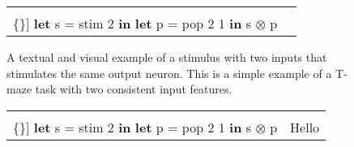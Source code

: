 \begin{figure}
  \ContinuedFloat*
  \begin{tabular}[t]{c c}
    \begin{minipage}{0.5\textwidth}
      \begin{Verbatim}[mathescape,commandchars=\\\{\}]
\textbf{let} s = stim 2 \textbf{in}
  \textbf{let} p = pop 2 1 \textbf{in}
    s $\otimes$ p
      \end{Verbatim}
    \end{minipage} & \begin{minipage}{0.5\textwidth}
       
    \end{minipage}

  \end{tabular}
  \caption{A textual and visual example of a stimulus with two inputs 
    that stimulates the same output neuron. This is a simple example 
    of a T-maze task with two consistent input features.}
  \label{fig:volr-example1}
\end{figure}

\begin{figure}
  \ContinuedFloat*
  \begin{tabular}[t]{c c}
    \begin{minipage}{0.5\textwidth}
      \begin{Verbatim}[mathescape,commandchars=\\\{\}]
\textbf{let} s = stim 2 \textbf{in}
  \textbf{let} p = pop 2 1 \textbf{in}
    s $\otimes$ p
      \end{Verbatim}
    \end{minipage} & \begin{minipage}{0.5\textwidth}
      Hello
    \end{minipage}
  \end{tabular}
\label{fig:volr-examples}
\end{figure}